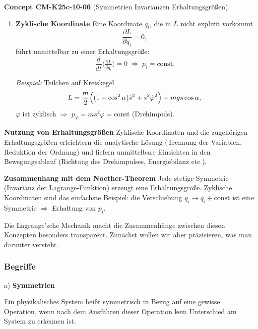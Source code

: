 \documentclass[10pt, letterpaper]{article}
\newcommand{\CustomHeading}[3]{%
  \par\medskip\noindent%
  \textbf{#1 #2} \textnormal{(#3)}.\enskip%
}
\newenvironment{CONC}[2]{\begin{unitbox}\CustomHeading{Concept}{#1}{#2}}{\end{unitbox}}
\begin{document}
\begin{CONC}{CM-K25c-10-06}{Symmetrien Invarianzen Erhaltungsgrößen}
\begin{enumerate}
\textit{Beispiel:} Geladenes Teilchen im EM-Feld  
$L=\tfrac{m}{2}\dot{\vec r}^{\,2}-Q(\phi-\dot{\vec r}\!\cdot\!\vec A/c)$  
liefert
\[
  \vec p=m\dot{\vec r}+\frac{Q}{c}\vec A
\]
(konjugierter Impuls $\neq$ kinematischer Impuls).

\item \textbf{Zyklische Koordinate}  
Eine Koordinate $q_i$, die in $L$ nicht explizit vorkommt
\[
  \frac{\partial L}{\partial q_i}=0,
\]
führt unmittelbar zu einer Erhaltungsgröße:
\[
  \frac{d}{dt}\bigl(\tfrac{\partial L}{\partial\dot q_i}\bigr)=0
  \;\Longrightarrow\;
  p_i=\text{const}.
\]

\textit{Beispiel:} Teilchen auf Kreiskegel  
\[
  L=\frac{m}{2}
     \Bigl((1+\cos^{2}\alpha)\dot s^{2}+s^{2}\dot\varphi^{2}\Bigr)
     -mg s\cos\alpha,
\]
$\varphi$ ist zyklisch $\Rightarrow$
$p_\varphi=m s^{2}\dot\varphi=\text{const}$ (Drehimpuls).

\end{enumerate}

\textbf{Nutzung von Erhaltungsgrößen}  
Zyklische Koordinaten und die zugehörigen Erhaltungsgrößen erleichtern
die analytische Lösung (Trennung der Variablen, Reduktion der Ordnung)
und liefern unmittelbare Einsichten in den Bewegungsablauf (Richtung
des Drehimpulses, Energiebilanz etc.).

\textbf{Zusammenhang mit dem Noether-Theorem}  
Jede stetige Symmetrie (Invarianz der Lagrange-Funktion) erzeugt eine
Erhaltungsgröße.  
Zyklische Koordinaten sind das einfachste Beispiel: die Verschiebung
$q_i\!\to\!q_i+\text{const}$ ist eine Symmetrie $\Rightarrow$
Erhaltung von $p_i$.
\end{CONC}






Die Lagrange'sche Mechanik macht die Zusammenhänge zwischen diesen Konzepten besonders transparent. Zunächst wollen wir aber präzisieren, was man darunter versteht.

\subsubsection{Begriffe}

a) \textbf{Symmetrien}

Ein physikalisches System heißt symmetrisch in Bezug auf eine gewisse Operation, wenn nach dem Ausführen dieser Operation kein Unterschied am System zu erkennen ist.
\end{document}
